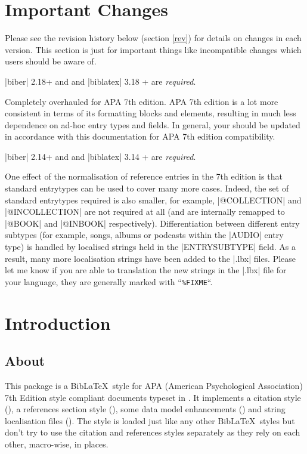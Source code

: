 \documentclass{ltxdockit}
\begin{document}
\printtitlepage
\tableofcontents

\section{Important Changes}\label{special}

Please see the revision history below (section \ref{rev}) for  details on changes in each
version. This section is just for important things like incompatible
changes which users should be aware of.

|biber| 2.18+ and and |biblatex| 3.18 + are \emph{required}.

Completely overhauled for APA 7th edition. APA 7th edition is a lot more
consistent in terms of its formatting blocks and elements, resulting in
much less dependence on ad-hoc entry types and fields. In general, your
 should be updated in accordance with this documentation for APA
7th edition compatibility. 

\noindent |biber| 2.14+ and and |biblatex| 3.14 + are \emph{required}.

One effect of the normalisation of reference entries in the 7th edition is
that standard entrytypes can be used to cover many more cases. Indeed, the
set of standard entrytypes required is also smaller, for example,
|@COLLECTION| and |@INCOLLECTION| are not required at all (and are
internally remapped to |@BOOK| and |@INBOOK| respectively). Differentiation
between different entry subtypes (for example, songs, albums or podcasts
within the |AUDIO| entry type) is handled by localised strings held in the
|ENTRYSUBTYPE| field. As a result, many more localisation strings have been
added to the |.lbx| files. Please let me know if you are able to
translation the new strings in the |.lbx| file for your language, they are
generally marked with ``\texttt{\%FIXME}``.

\section{Introduction}\label{int}

\subsection{About}

This package is a Bib\LaTeX\ style for APA (American Psychological
Association) 7th Edition style compliant documents typeset in \latex. It
implements a citation style (), a references section style
(), some data model enhancements () and string
localisation files (). The style is loaded just
like any other Bib\LaTeX\ styles but don't try to use the citation and
references styles separately as they rely on each other, macro-wise, in
places.
\end{document}
